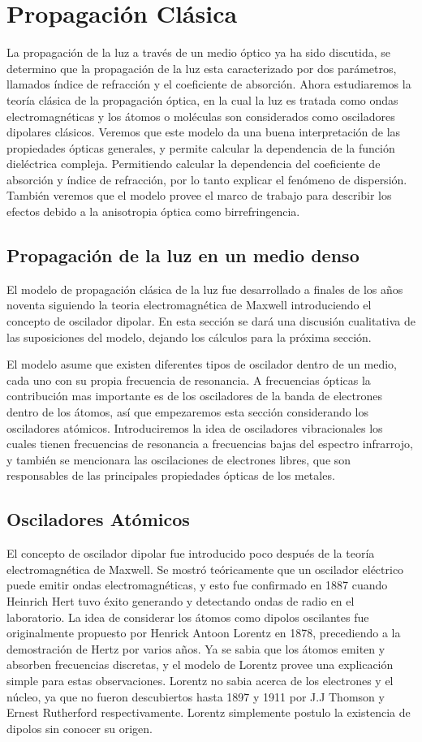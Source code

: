 \documentclass[a4paper,openright,12pt]{book}
\begin{document}
\section{Propagación Clásica}
La propagación de la luz a través de un medio óptico ya ha sido discutida, se determino que la propagación de la luz esta caracterizado por dos parámetros, llamados índice de refracción y el coeficiente de absorción. Ahora estudiaremos la teoría clásica de la propagación óptica, en la cual la luz es tratada como ondas electromagnéticas y los átomos o moléculas son considerados como osciladores dipolares clásicos. Veremos que este modelo da una buena interpretación de las propiedades ópticas generales, y permite calcular la dependencia de la función dieléctrica compleja. Permitiendo calcular la dependencia del coeficiente de absorción y índice de refracción, por lo tanto explicar el fenómeno de dispersión. También veremos que el modelo provee el marco de trabajo para describir los efectos debido a la anisotropia óptica como birrefringencia.

\subsection{Propagación de la luz en un medio denso}
El modelo de propagación clásica de la luz fue desarrollado a finales de los años noventa siguiendo la teoria electromagnética de Maxwell introduciendo el concepto de oscilador dipolar. En esta sección se dará una discusión cualitativa de las suposiciones del modelo, dejando los cálculos para la próxima sección.

El modelo asume que existen diferentes tipos de oscilador dentro de un medio, cada uno con su propia frecuencia de resonancia. A frecuencias ópticas la contribución mas importante es de los osciladores de la banda de electrones dentro de los átomos, así que empezaremos esta sección considerando los osciladores atómicos. Introduciremos la idea de osciladores vibracionales los cuales tienen frecuencias de resonancia a frecuencias bajas del espectro infrarrojo, y también se mencionara las oscilaciones de electrones libres, que son responsables de las principales propiedades ópticas de los metales.


\subsection{Osciladores Atómicos}
El concepto de oscilador dipolar fue introducido poco después de la teoría electromagnética de Maxwell. Se mostró teóricamente que un oscilador eléctrico puede emitir ondas electromagnéticas, y esto fue confirmado en 1887 cuando Heinrich Hert tuvo éxito generando y detectando ondas de radio en el laboratorio. La idea de considerar los átomos como dipolos oscilantes fue originalmente propuesto por Henrick Antoon Lorentz en 1878, precediendo a la demostración de Hertz por varios años. Ya se sabia que los átomos emiten y absorben frecuencias discretas, y el modelo de Lorentz provee una explicación simple para estas observaciones. Lorentz no sabia acerca de los electrones y el núcleo, ya que no fueron descubiertos hasta 1897 y 1911 por J.J Thomson y Ernest Rutherford respectivamente. Lorentz simplemente postulo la existencia de dipolos sin conocer su origen.
\end{document}
